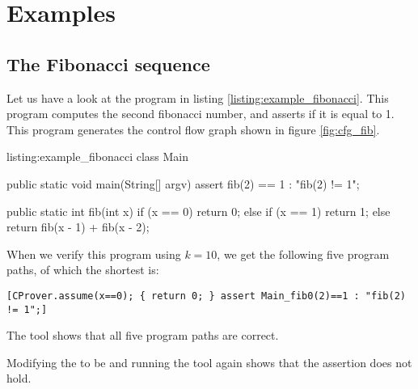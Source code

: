 \chapter{Examples} \label{app:examples}

\section{The Fibonacci sequence}
Let us have a look at the program in listing \ref{listing:example_fibonacci}. This
program computes the second fibonacci number, and asserts if it is equal to 1. This
program generates the control flow graph shown in figure \ref{fig:cfg_fib}.

\begin{Java}{listing:example_fibonacci}{}
class Main {
    public static void main(String[] argv) {
        assert fib(2) == 1 : "fib(2) != 1";
    }

    public static int fib(int x) {
        if (x == 0) {
            return 0;
        } else if (x == 1) {
            return 1;
        } else {
            return fib(x - 1) + fib(x - 2);
        }
    }
}
\end{Java}

When we verify this program using $k=10$, we get the following five program 
paths, of which the shortest is:

\begin{lstlisting}[basicstyle=\small\ttfamily]
[CProver.assume(x==0); { return 0; } assert Main_fib0(2)==1 : "fib(2) != 1";]
\end{lstlisting}

The tool shows that all five program paths are correct. 

Modifying the  to be
 and running the tool again
shows that the assertion does not hold.


